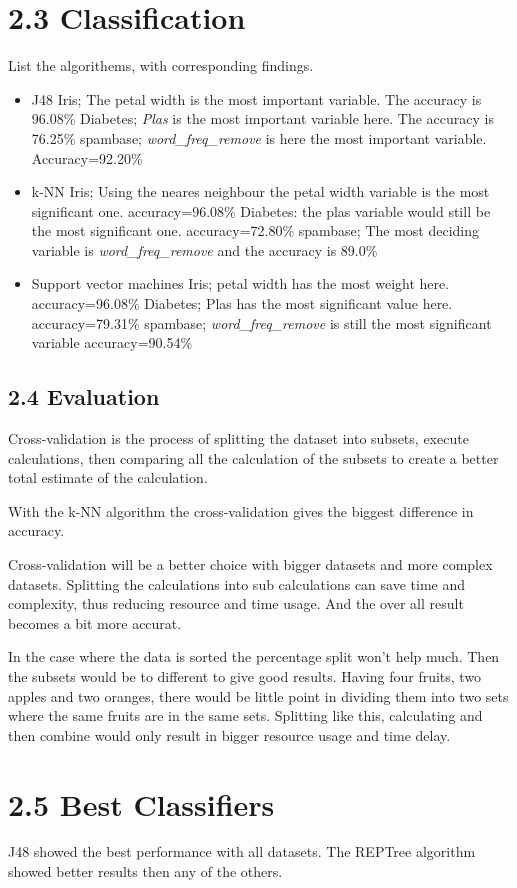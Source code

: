 \documentclass[12pt, a4paper]{article}
\begin{document}
\section{2.3 Classification}


List the algorithems, with corresponding findings. 
\begin{itemize}
	\item J48
	\subitem Iris; The petal width is the most important variable.
The accuracy is 96.08\%
	\subitem Diabetes; \textit{Plas} is the most important variable here.
The accuracy is 76.25\%
	\subitem spambase; \textit{word\_freq\_remove} is here the most important
variable. Accuracy=92.20\%

	\item k-NN
	\subitem Iris; Using the neares neighbour the petal width variable is the
most significant one. accuracy=96.08\%
	\subitem Diabetes: the plas variable would still be the most significant
one. accuracy=72.80\%
	\subitem spambase; The most deciding variable is \textit{word\_freq\_remove}
and the accuracy is 89.0\%
	

	\item Support vector machines
	\subitem Iris; petal width has the most weight here. accuracy=96.08\%
	\subitem Diabetes; Plas has the most significant value here. accuracy=79.31\%
	\subitem spambase; \textit{word\_freq\_remove} is still the most
significant variable accuracy=90.54\%
\end{itemize}


\subsection{2.4 Evaluation}
Cross-validation is the process of splitting the dataset into subsets,
execute calculations, then comparing all the calculation of the subsets to
create a better total estimate of the calculation. 

With the k-NN algorithm the cross-validation gives the biggest difference in
accuracy. 

Cross-validation will be a better choice with bigger datasets and more complex
datasets. Splitting the calculations into sub calculations can save time and
complexity, thus reducing resource and time usage. And the over all result
becomes a bit more accurat.

In the case where the data is sorted the percentage split won't help much. Then
the subsets would be to different to give good results. Having four fruits, two
apples and two oranges, there would be little point in dividing them into two
sets where the same fruits are in the same sets. Splitting like this,
calculating and then combine would only result in bigger resource usage and
time delay. 

\section{2.5 Best Classifiers}

J48 showed the best performance with all datasets. 
The REPTree algorithm showed better results then any of the others. 
\end{document}
